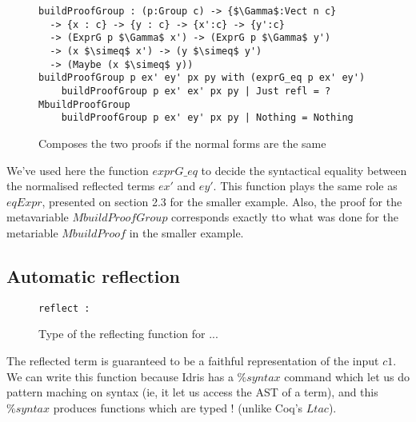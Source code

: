 \begin{figure}[H]
\figrule
\begin{center}
\begin{lstlisting}
buildProofGroup : (p:Group c) -> {$\Gamma$:Vect n c} 
  -> {x : c} -> {y : c} -> {x':c} -> {y':c} 
  -> (ExprG p $\Gamma$ x') -> (ExprG p $\Gamma$ y') 
  -> (x $\simeq$ x') -> (y $\simeq$ y') 
  -> (Maybe (x $\simeq$ y))
buildProofGroup p ex' ey' px py with (exprG_eq p ex' ey')
    buildProofGroup p ex' ex' px py | Just refl = ?MbuildProofGroup
    buildProofGroup p ex' ey' px py | Nothing = Nothing
\end{lstlisting}
\end{center}
\caption{Composes the two proofs if the normal forms are the same}
\figrule
\end{figure}
We've used here the function $exprG\_eq$ to decide the syntactical equality between the normalised reflected terms $ex'$ and $ey'$. This function plays the same role as $eqExpr$, presented on section 2.3 for the smaller example. Also, the proof for the metavariable $MbuildProofGroup$ corresponds exactly tto what was done for the metariable $MbuildProof$ in the smaller example.


\subsection {Automatic reflection}

\begin{figure}[H]
\figrule
\begin{center}
\begin{lstlisting}
reflect : 
\end{lstlisting}
\end{center}
\caption{Type of the reflecting function for ...}
\figrule
\end{figure}

The reflected term is guaranteed to be a faithful representation of the input $c1$. We can write this function because Idris has a $\%syntax$ command which let us do pattern maching on syntax (ie, it let us access the AST of a term), and this $\%syntax$ produces functions which are typed ! (unlike Coq's $Ltac$). 









